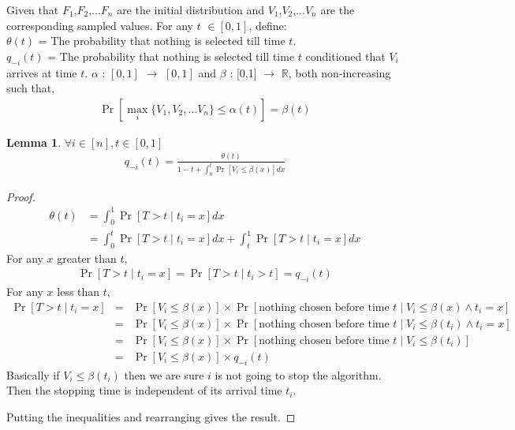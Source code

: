 \documentclass[10pt, letterpaper, twoside]{article}
\newtheorem{lemma}{Lemma}
\begin{document}
	Given that $F_{1}$,$F_{2}$,...$F_{n}$ are the initial distribution and $V_{1}$,$V_{2}$,...$V_{n}$ are the corresponding sampled values. For any $t$ $\in [0,1] $, define:\\
	$\theta(t)$ = The probability that nothing is selected till time $t$.\\
	$q_{-i}(t)$ = The probability that nothing is selected till time $t$ conditioned that $V_{i}$ arrives at time $t$.
	$\alpha$ : $[0,1]$ $\rightarrow$ $[0,1]$ and $\beta$ : [0,1] $\rightarrow$ $\mathbb{R}$, both non-increasing such that,
	\begin{align*}
	\Pr[\max_{i} \{V_{1},V_{2},...V_{n}\} \leq \alpha(t)] = \beta(t)
	\end{align*}
	\begin{lemma} $\forall i \in [n], t \in [0,1]$
		\begin{align*}
		q_{-i}(t) = \frac{\theta(t)}{1-t+\int_{0}^{t} \Pr[V_{i} \leq \beta(x)]  dx}
		\end{align*}
	\end{lemma}
	\begin{proof}
		\begin{align*}
		\theta(t) &= \int_{0}^{1} \Pr[T > t \mid t_{i} = x] dx\\
		&= \int_{0}^{t} \Pr[T > t \mid t_{i} = x] dx + \int_{t}^{1} \Pr[T > t \mid t_{i} = x] dx
		\end{align*}
		For any $x$ greater than $t$,
		\begin{align*}
		\Pr[T > t \mid t_{i} = x] = \Pr[T > t \mid t_{i} > t] = q_{-i}(t)
		\end{align*}
		For any $x$ less than $t$,
		\begin{eqnarray*}
			\Pr[T > t \mid t_{i} = x] & = & \Pr[V_{i} \leq \beta(x)] \times \Pr[\text{nothing chosen before time }t \mid V_{i} \leq \beta(x) \wedge t_{i} = x]\\
			& = & \Pr[V_{i} \leq \beta(x)] \times \Pr[\text{nothing chosen before time }t \mid V_{i} \leq \beta(t_i) \wedge t_{i} = x]\\
			& = & \Pr[V_{i} \leq \beta(x)] \times \Pr[\text{nothing chosen before time }t \mid V_{i} \leq \beta(t_i)]\\
			& = & \Pr[V_{i} \leq \beta(x)] \times q_{-i}(t)
		\end{eqnarray*}
		Basically if $V_{i} \leq \beta(t_i)$ then we are sure $i$ is not going to stop the algorithm. Then the stopping time is independent of its arrival time $t_i$.
		
		Putting the inequalities and rearranging gives the result.
	\end{proof}
\end{document}

